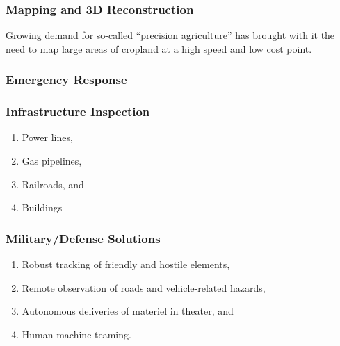 \subsubsection{Mapping and 3D Reconstruction}

Growing demand for so-called ``precision agriculture'' has brought with it the need to map large areas of cropland at a high speed and low cost point. 

\subsubsection{Emergency Response}


\subsubsection{Infrastructure Inspection}

\begin{enumerate}
    \item Power lines,
    \item Gas pipelines,
    \item Railroads, and
    \item Buildings
\end{enumerate}

\subsubsection{Military/Defense Solutions}

\begin{enumerate}
    \item Robust tracking of friendly and hostile elements,
    \item Remote observation of roads and vehicle-related hazards,
    \item Autonomous deliveries of materiel in theater, and
    \item Human-machine teaming.
\end{enumerate}